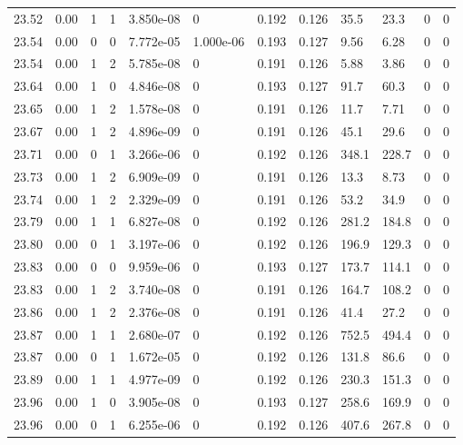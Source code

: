 \documentclass[preview]{standalone}
\begin{document}
{{{{{{{{{{{{{{{{{{{\begin{tabular}{L{1.2cm}C{1.2cm} C{0.3cm}C{0.5cm} C{1.4cm}C{1.4cm} C{1.4cm}C{1.4cm} C{1.6cm}C{1.6cm} C{1.6cm}C{1.6cm}}
  23.52  &  0.00  & 1     &  1 &  3.850e-08  & 0  &  0.192&   0.126& 35.5 & 23.3   &  0 & 0  \\ 
  23.54  &  0.00  & 0     &  0 &  7.772e-05  & 1.000e-06  &  0.193&   0.127& 9.56 & 6.28   &  0 & 0  \\ 
  23.54  &  0.00  & 1     &  2 &  5.785e-08  & 0  &  0.191&   0.126& 5.88 & 3.86   &  0 & 0  \\ 
  23.64  &  0.00  & 1     &  0 &  4.846e-08  & 0  &  0.193&   0.127& 91.7 & 60.3   &  0 & 0  \\ 
  23.65  &  0.00  & 1     &  2 &  1.578e-08  & 0  &  0.191&   0.126& 11.7 & 7.71   &  0 & 0  \\ 
  23.67  &  0.00  & 1     &  2 &  4.896e-09  & 0  &  0.191&   0.126& 45.1 & 29.6   &  0 & 0  \\ 
  23.71  &  0.00  & 0     &  1 &  3.266e-06  & 0  &  0.192&   0.126& 348.1 & 228.7   &  0 & 0  \\ 
  23.73  &  0.00  & 1     &  2 &  6.909e-09  & 0  &  0.191&   0.126& 13.3 & 8.73   &  0 & 0  \\ 
  23.74  &  0.00  & 1     &  2 &  2.329e-09  & 0  &  0.191&   0.126& 53.2 & 34.9   &  0 & 0  \\ 
  23.79  &  0.00  & 1     &  1 &  6.827e-08  & 0  &  0.192&   0.126& 281.2 & 184.8   &  0 & 0  \\ 
  23.80  &  0.00  & 0     &  1 &  3.197e-06  & 0  &  0.192&   0.126& 196.9 & 129.3   &  0 & 0  \\ 
  23.83  &  0.00  & 0     &  0 &  9.959e-06  & 0  &  0.193&   0.127& 173.7 & 114.1   &  0 & 0  \\ 
  23.83  &  0.00  & 1     &  2 &  3.740e-08  & 0  &  0.191&   0.126& 164.7 & 108.2   &  0 & 0  \\ 
  23.86  &  0.00  & 1     &  2 &  2.376e-08  & 0  &  0.191&   0.126& 41.4 & 27.2   &  0 & 0  \\ 
  23.87  &  0.00  & 1     &  1 &  2.680e-07  & 0  &  0.192&   0.126& 752.5 & 494.4   &  0 & 0  \\ 
  23.87  &  0.00  & 0     &  1 &  1.672e-05  & 0  &  0.192&   0.126& 131.8 & 86.6   &  0 & 0  \\ 
  23.89  &  0.00  & 1     &  1 &  4.977e-09  & 0  &  0.192&   0.126& 230.3 & 151.3   &  0 & 0  \\ 
  23.96  &  0.00  & 1     &  0 &  3.905e-08  & 0  &  0.193&   0.127& 258.6 & 169.9   &  0 & 0  \\ 
  23.96  &  0.00  & 0     &  1 &  6.255e-06  & 0  &  0.192&   0.126& 407.6 & 267.8   &  0 & 0  \\ 

\end{tabular}}}}}}}}}}}}}}}}}}}}
\end{document}
